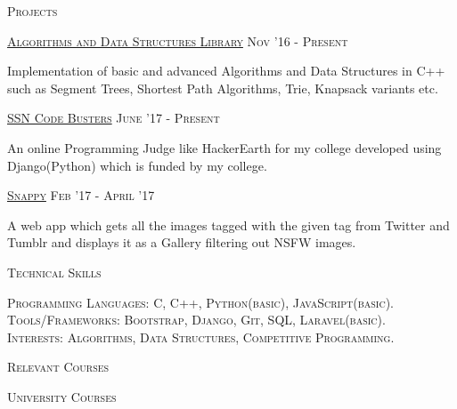 \documentclass[11pt]{article}
\begin{document}
	{\centering\Large{\textsc{Projects}} \hrulefill}
		
	\vspace{3mm}
	
	\large{\textsc{\href{https://chamow97.github.io/Algorithm-DS-Library/}{Algorithms and Data Structures Library}}   \hfill \small\textsc{Nov '16 - Present}
	\begin{itemize}
	\small
	{
	\item Implementation of basic and advanced Algorithms and Data Structures in C++ such as Segment Trees, Shortest Path Algorithms, Trie, Knapsack variants etc.
	}
	\end{itemize}	
	\vspace{2mm}
	\large{\textsc{\href{https://chamow97.github.io/SSNCB/}{SSN Code Busters}}}   \hfill \small\textsc{June '17 - Present}
	\begin{itemize}
	\small
	{
	\item An online Programming Judge like HackerEarth for my college developed using Django(Python) which is funded by my college.
	}
	\end{itemize}	
	\vspace{2mm}
	\large{\textsc{\href{https://chamow97.github.io/snappy/}{Snappy}}}   \hfill \small\textsc{Feb '17 - April '17}
	\begin{itemize}
	\small
	{
	\item A web app which gets all the images tagged with the given tag from Twitter and Tumblr and displays it as a Gallery filtering out NSFW images.
	}
	\end{itemize}	
	\vspace{3mm}
	
		{\centering\Large{\textsc{Technical Skills}}\hrulefill}
	
	\vspace{3mm}

	\normalsize{
	\textsc{Programming Languages:} \textsc{C, C++, Python(basic), JavaScript(basic).} \\
	\textsc{Tools/Frameworks:} \textsc{Bootstrap, Django, Git, SQL, Laravel(basic).}
	}\\
	\textsc{Interests:} \textsc{Algorithms, Data Structures, Competitive Programming.}
			
	\vspace{4mm}
		{\centering\Large{\textsc{Relevant Courses}}\hrulefill}
		
	\vspace{4mm}
	\large{\textsc{University Courses}}
	\vspace{2mm}
	\begin{small}
	

\end{small}}
\end{document}
